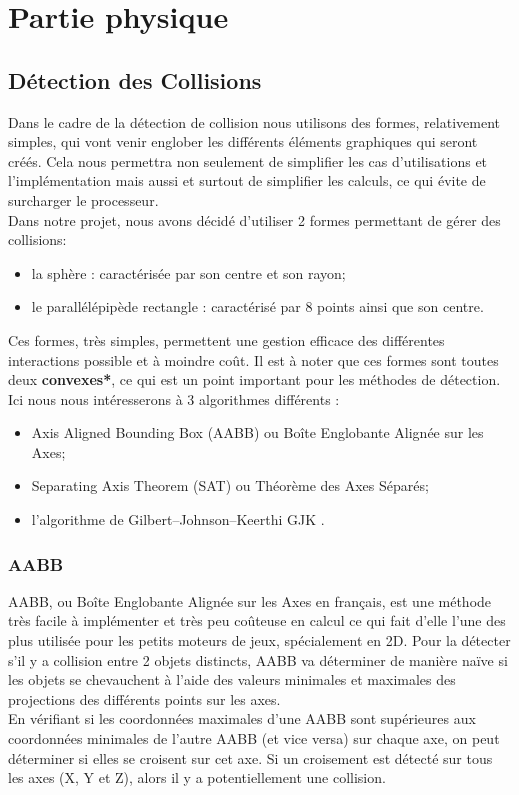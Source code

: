 \section{Partie physique}
\subsection{Détection des Collisions}
Dans le cadre de la détection de collision nous utilisons des formes, relativement simples, qui vont venir englober les différents éléments graphiques qui seront créés. Cela nous permettra non seulement de simplifier les cas d'utilisations et l'implémentation mais aussi et surtout de simplifier les calculs, ce qui évite de surcharger le processeur.\\

Dans notre projet, nous avons décidé d'utiliser 2 formes permettant de gérer des collisions:
\begin{itemize}[label=-]
	\item la sphère : caractérisée par son centre et son rayon;
	\item le parallélépipède rectangle : caractérisé par 8 points ainsi que son centre.
\end{itemize}

\noindent Ces formes, très simples, permettent une gestion efficace des différentes interactions possible et à moindre coût. Il est à noter que ces formes sont toutes deux \textbf{convexes*}, ce qui est un point important pour les méthodes de détection. Ici nous nous intéresserons à 3 algorithmes différents :
\begin{itemize}[label=-]
	\item Axis Aligned Bounding Box (AABB) ou Boîte Englobante Alignée sur les Axes;
	\item Separating Axis Theorem (SAT) ou Théorème des Axes Séparés;
	\item l'algorithme de Gilbert–Johnson–Keerthi GJK \citep{GJK2} \cite{GJK1}.
\end{itemize}

\subsubsection{AABB}
AABB, ou Boîte Englobante Alignée sur les Axes en français, est une méthode très facile à implémenter et très peu coûteuse en calcul ce qui fait d'elle l'une des plus utilisée pour les petits moteurs de jeux, spécialement en 2D. Pour la détecter s'il y a collision entre 2 objets distincts, AABB va déterminer de manière naïve si les objets se chevauchent à l'aide des valeurs minimales et maximales des projections des différents points sur les axes.\\
En vérifiant si les coordonnées maximales d'une AABB sont supérieures aux coordonnées minimales de l'autre AABB (et vice versa) sur chaque axe, on peut déterminer si elles se croisent sur cet axe. Si un croisement est détecté sur tous les axes (X, Y et Z), alors il y a potentiellement une collision.

